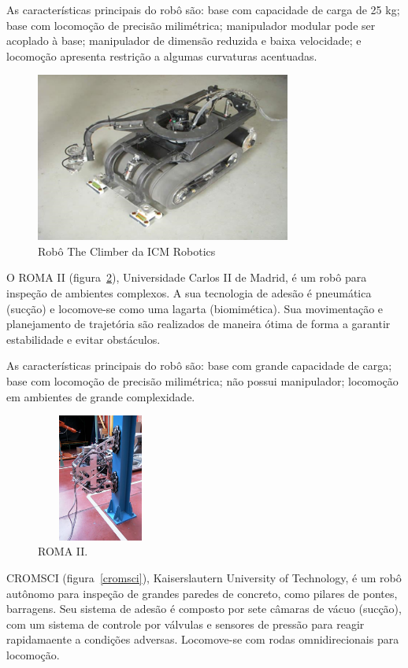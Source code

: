 As características principais do robô são: base com capacidade de carga de 25
kg; base com locomoção de precisão milimétrica; manipulador modular pode ser
acoplado à base; manipulador de dimensão reduzida e baixa velocidade; e
locomoção apresenta restrição a algumas curvaturas acentuadas.

\begin{figure}[ht]
\centering
\includegraphics[width=8.4cm]{figs/climbers/icm.png}
\caption{Robô The Climber da ICM Robotics}
\label{icm}
\end{figure}

O ROMA II (figura~\ref{roma2}), Universidade Carlos II de Madrid, é um robô para
inspeção de ambientes complexos. A sua tecnologia de adesão é pneumática (sucção) e
locomove-se como uma lagarta (biomimética). Sua movimentação e planejamento de
trajetória são realizados de maneira ótima de forma a garantir estabilidade e
evitar obstáculos. 

As características principais do robô são: base com grande capacidade de carga;
base com locomoção de precisão milimétrica; não possui manipulador; locomoção em
ambientes de grande complexidade.

\begin{figure}[ht]
\centering
\includegraphics[width=4.2cm,height=4.2cm]{figs/climbers/roma2.jpg}
\caption{ROMA II.}
\label{roma2}
\end{figure}

CROMSCI (figura~\ref{cromsci}), Kaiserslautern University of Technology, é um
robô autônomo para inspeção de grandes paredes de concreto, como pilares de pontes, barragens. Seu
sistema de adesão é composto por sete câmaras de vácuo (sucção), com um sistema
de controle por válvulas e sensores de pressão para reagir rapidamaente a
condições adversas. Locomove-se com rodas omnidirecionais para locomoção.

